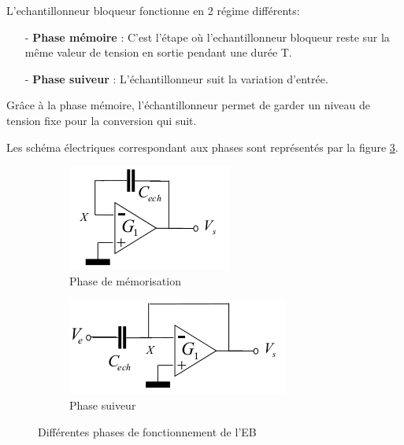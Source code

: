 \documentclass[11pt]{article}
\begin{document}
\medskip
L'echantillonneur bloqueur fonctionne en 2 r\'egime diff\'erents:
\begin{itemize}
  \item[-]\textbf{Phase m\'emoire} : C'est l'\'etape o\`u l'echantillonneur bloqueur
  reste sur la m\^eme valeur de tension en sortie pendant une dur\'ee T.
  \item[-]\textbf{Phase suiveur} : L'\'echantillonneur suit la variation d'entr\'ee.
\end{itemize}

Gr\^ace \`a la phase m\'emoire, l'\'echantillonneur permet de garder un niveau de tension
fixe pour la conversion qui suit.

Les sch\'ema \'electriques correspondant aux phases sont repr\'esent\'es par la figure \ref{fig:figEBfonct}.

\clearpage

\begin{figure}[!htb]
  \begin{subfigure}[t]{.5\linewidth}
      \centering
      \includegraphics[width=0.6\linewidth]{memoire_EB.png}
      \caption{Phase de m\'emorisation}
      \label{fig:sfigEBmem}
  \end{subfigure}%
  \begin{subfigure}[t]{.5\linewidth}
    \centering
    \includegraphics[width=0.6\linewidth]{suiveur_EB.png}
    \caption{Phase suiveur}
    \label{fig:sfigEBsuiv}
  \end{subfigure}%
  \caption{Diff\'erentes phases de fonctionnement de l'EB}
  \label{fig:figEBfonct}
\end{figure}
\end{document}
